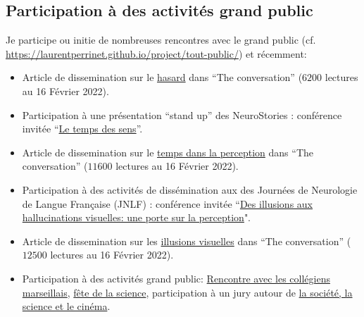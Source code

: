 \documentclass[10pt,french,a4paper,oneside]{article}%
\newcommand{\years}[1]{\marginpar{\textit{\scriptsize #1}}}
\begin{document}
\subsection{Participation à des activités grand public} %

Je participe ou initie de nombreuses rencontres avec le grand public (cf. \url{https://laurentperrinet.github.io/project/tout-public/}) et récemment:

\begin{itemize}

	\item Article de dissemination sur le \href{https://laurentperrinet.github.io/publication/perrinet-21-hasard/}{hasard} dans ``The conversation'' ($6200$ lectures au 16 Février 2022).

	\item Participation à une présentation ``stand up'' des NeuroStories : conférence invitée  ``\href{https://laurentperrinet.github.io/post/2019-10-07_neurostories/}{Le temps des sens}''.

	\item Article de dissemination sur le \href{https://laurentperrinet.github.io/publication/perrinet-19-temps/}{temps dans la perception} dans ``The conversation'' ($11600$ lectures au 16 Février 2022).

	\item Participation à des activités de dissémination aux des Journées de Neurologie de Langue Française (JNLF) : conférence invitée  ``\href{https://laurentperrinet.github.io/talk/2019-04-18-jnlf/}{Des illusions aux hallucinations visuelles: une porte sur la perception}".

	\item Article de dissemination sur les \href{https://theconversation.com/illusions-et-hallucinations-visuelles-une-porte-sur-la-perception-117389}{illusions visuelles} dans ``The conversation'' ($12500$ lectures au 16 Février 2022).

	\item Participation à des activités grand public: \href{https://laurentperrinet.github.io/talk/2019-01-10-polly-maggoo/}{Rencontre avec les collégiens marseillais}, \href{https://laurentperrinet.github.io/talk/2018-10-10-polly-maggoo/}{fête de la science}, participation à un jury autour de \href{https://laurentperrinet.github.io/talk/2017-11-17-festival-interferences/}{la société, la science et le cinéma}.


%
%
%


\end{itemize}
\end{document}
